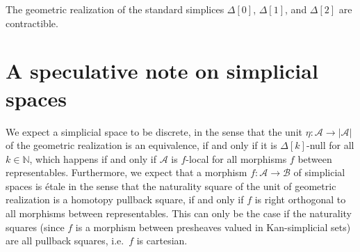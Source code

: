 \begin{cor}
The geometric realization of the standard simplices $\Delta[0]$, $\Delta[1]$, and $\Delta[2]$ are contractible.
\end{cor}

\section{A speculative note on simplicial spaces}

We expect a simplicial space to be discrete, in the sense that the unit $\eta:\mathcal{A}\to |\mathcal{A}|$ of the geometric realization is an equivalence, if and only if it is $\Delta[k]$-null for all $k\in\mathbb{N}$, which happens if and only if $\mathcal{A}$ is $f$-local for all morphisms $f$ between representables. Furthermore, we expect that a morphism $f:\mathcal{A}\to\mathcal{B}$ of simplicial spaces is \'etale in the sense that the naturality square of the unit of geometric realization is a homotopy pullback square, if and only if $f$ is right orthogonal to all morphisms between representables. This can only be the case if the naturality squares (since $f$ is a morphism between presheaves valued in Kan-simplicial sets) are all pullback squares, i.e.~$f$ is cartesian. 
